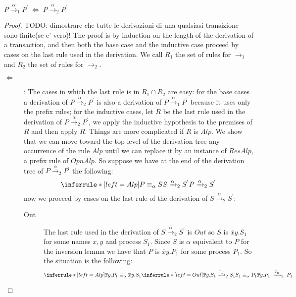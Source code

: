 \begin{theorem}
  $P\xrightarrow{\alpha}_{1}P^{'}\; \Leftrightarrow\; P\xrightarrow{\alpha}_{2}P^{'}$
  \begin{proof}
    TODO: dimostrare che tutte le derivazioni di una qualsiasi transizione sono finite(se e' vero)!
    The proof is by induction on the length of the derivation of a transaction, and then both the base case and the inductive case proceed by cases on the last rule used in the derivation.
    We call $R_{1}$ the set of rules for $\rightarrow_{1}$ and $R_{2}$ the set of rules for $\rightarrow_{2}$.
    \begin{description}
      \item[$\Leftarrow$]:
	The cases in which the last rule is in $R_{1}\cap R_{2}$ are easy: for the base cases a derivation of $P\xrightarrow{\alpha}_{2}P^{'}$ is also a derivation of $P\xrightarrow{\alpha}_{1}P^{'}$ because it uses only the prefix rules; for the inductive cases, let $R$ be the last rule used in the derivation of $P\xrightarrow{\alpha}_{2}P^{'}$, we apply the inductive hypothesis to the premises of $R$ and then apply $R$. Things are more complicated if $R$ is $Alp$. We show that we can move toward the top level of the derivation tree any occurrence of the rule $Alp$ until we can replace it by an instance of $ResAlp$, a prefix rule of $OpnAlp$. So suppose we have at the end of the derivation tree of $P\xrightarrow{\alpha}_{2}P^{'}$ the following:
	\[
	  \inferrule* [left=Alp]{
	      P\equiv_{\alpha} S
	    \\
	      S\xrightarrow{\alpha}_{2}S^{'}
	  }{
	    P\xrightarrow{\alpha}_{2}S^{'}
	  }
	\]
	now we proceed by cases on the last rule of the derivation of $S\xrightarrow{\alpha}_{2}S^{'}$:
	\begin{description}
	  \item[Out] 
	    The last rule used in the derivation of $S\xrightarrow{\alpha}_{2}S^{'}$ is $Out$ so $S$ is $\overline{x}y.S_{1}$ for some names $x,y$ and process $S_{1}$. Since $S$ is $\alpha$ equivalent to $P$ for the inversion lemma we have that $P$ is $\overline{x}y.P_{1}$ for some process $P_{1}$. So the situation is the following:
	    \[
	      \inferrule* [left=Alp]{
		  \overline{x}y.P_{1}\equiv_{\alpha}\overline{x}y.S_{1}
		\\
		  \inferrule* [left=Out]{
		  }{
		    \overline{x}y.S_{1}\xrightarrow{\overline{x}y}_{2}S_{1}
		  }
		\\
		  S_{1}\equiv_{\alpha} P_{1}
	      }{
		\overline{x}y.P_{1}\; \xrightarrow{\overline{x}y}_{2}\; P_{1}
}\]
\end{description}
\end{description}
\end{proof}
\end{theorem}
